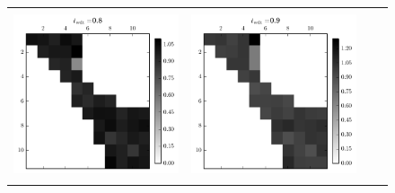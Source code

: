 \begin{figure}[h]
\begin{tabular}{cccc}
    \\
&& \\
    \includegraphics[scale=0.75]{images/results/matshows/homog_sp0_matshow_7}
    &
    \includegraphics[scale=0.75]{images/results/matshows/homog_sp0_matshow_8}
    \\
    &  \\
    \end{tabular}
\end{figure}

